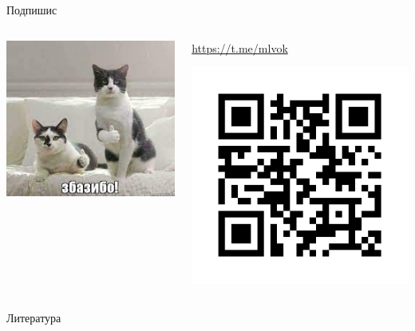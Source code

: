 \documentclass[11pt,aspectratio=169,handout]{beamer}
\begin{document}
\begin{frame}{Подпишис}

\begin{columns}
\begin{column}{0.45\textwidth}
   \begin{center}
                \includegraphics[scale=0.7]{images/zbazibo.jpeg}
   \end{center}
\end{column}
\begin{column}{0.45\textwidth}
   \begin{center}
                \url{https://t.me/mlvok}

                \includegraphics[scale=0.5]{images/tgqr.png}
   \end{center}
\end{column}
\end{columns}

\end{frame}

\begin{frame}[allowframebreaks]{Литература}




\end{frame}
\end{document}
